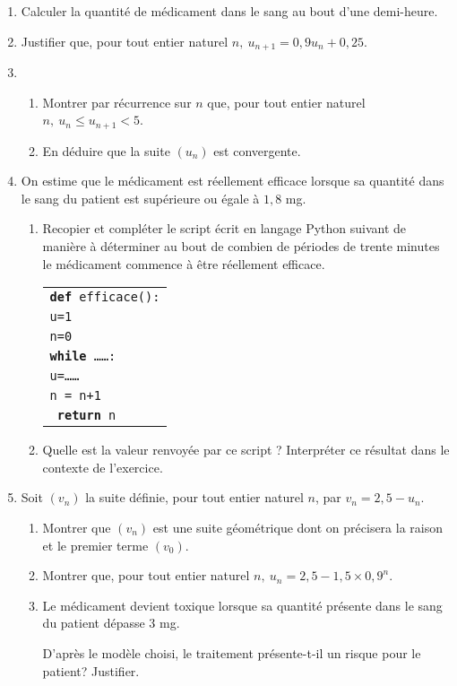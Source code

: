 \documentclass[10pt,a4paper]{article}
\begin{document}
\begin{enumerate}
\item Calculer la quantité de médicament dans le sang au bout d'une demi-heure.
\item Justifier que, pour tout entier naturel $n,\: u_{n+1} = 0,9u_n + 0,25$.
\item 
	\begin{enumerate}
		\item Montrer par récurrence sur $n$ que, pour tout entier naturel $n,\: u_n \leqslant  u_{n+1} < 5$.
		\item En déduire que la suite $\left(u_n\right)$ est convergente.
	\end{enumerate}
\item On estime que le médicament est réellement efficace lorsque sa quantité dans le sang
du patient est supérieure ou égale à $1,8$ mg.
	\begin{enumerate}
		\item Recopier et compléter le script écrit en langage Python suivant de manière à déterminer au bout de combien de périodes de trente minutes le médicament commence à être réellement efficace.
\begin{center}
\begin{tabular}{|l|}\hline
\texttt{\textbf{def} efficace():}\\
\quad \texttt{u=1}\\
\quad \texttt{n=0}\\
\quad \texttt{\textbf{while} \ldots\ldots :}\\
\quad\qquad \texttt{u=\ldots\ldots}\\
\quad\qquad \texttt{n = n+1}\\
\quad \texttt{\textbf{ return }n}\\ \hline
\end{tabular}
\end{center}

		\item Quelle est la valeur renvoyée par ce script ? Interpréter ce résultat dans le contexte de l'exercice.
	\end{enumerate}		
\item Soit $\left(v_n\right)$ la suite définie, pour tout entier naturel $n$, par $v_n = 2,5 - u_n$.
	\begin{enumerate}
		\item Montrer que $\left(v_n\right)$ est une suite géométrique dont on précisera la raison et le premier terme $\left(v_0\right)$.
		\item Montrer que, pour tout entier naturel $n,\: u_n = 2,5 - 1,5 \times 0,9^n$.
		\item Le médicament devient toxique lorsque sa quantité présente dans le sang du patient dépasse $3$ mg. 
		
D'après le modèle choisi, le traitement présente-t-il un risque pour le patient? Justifier.
	\end{enumerate}
\end{enumerate}
\end{document}
